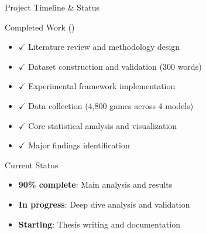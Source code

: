 \documentclass[aspectratio=169]{beamer}
\begin{document}
\begin{frame}{Project Timeline \& Status}
\begin{block}{Completed Work (\checkmark)}
\begin{itemize}
    \item $\checkmark$ Literature review and methodology design
    \item $\checkmark$ Dataset construction and validation (300 words)
    \item $\checkmark$ Experimental framework implementation
    \item $\checkmark$ Data collection (4,800 games across 4 models)
    \item $\checkmark$ Core statistical analysis and visualization
    \item $\checkmark$ Major findings identification
\end{itemize}
\end{block}

\begin{block}{Current Status}
\begin{itemize}
    \item \textbf{90\% complete}: Main analysis and results
    \item \textbf{In progress}: Deep dive analysis and validation
    \item \textbf{Starting}: Thesis writing and documentation
\end{itemize}
\end{block}
\end{frame}
\end{document}
